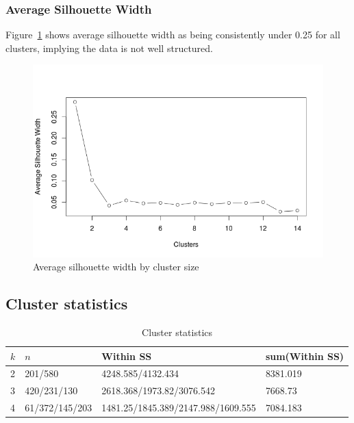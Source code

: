 \documentclass[letterpaper,12pt]{article}
\begin{document}
\subsubsection{Average Silhouette Width}

Figure~\ref{fig:asw} shows average silhouette width as being consistently under
0.25 for all clusters, implying the data is not well structured.

\begin{figure}[ht]
  \centering
  \includegraphics[width=0.8\linewidth]{asw.png}
  \caption{Average silhouette width by cluster size}
  \label{fig:asw}
\end{figure}


\subsection{Cluster statistics}
\begin{table}[ht]
  \centering
  \begin{tabular}{l|l|l|l}
    $k$ & $n$ & Within SS & sum(Within SS) \\
    \hline
    2 & 201/580 & 4248.585/4132.434 & 8381.019 \\
    3 & 420/231/130 & 2618.368/1973.82/3076.542 &  7668.73 \\
    4 & 61/372/145/203 & 1481.25/1845.389/2147.988/1609.555 & 7084.183
  \end{tabular}
  \caption{Cluster statistics}
  \label{tab:cluster-statistics}
\end{table}
\end{document}
